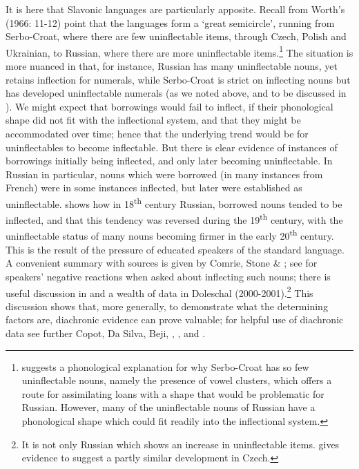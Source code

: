\documentclass[output=paper]{langscibook}
\begin{document}
It is here that Slavonic languages are particularly apposite. Recall from  Worth’s (1966: 11-12) point that the languages form a ‘great semicircle’, running from Serbo-Croat, where there are few uninflectable items, through Czech, Polish and Ukrainian, to Russian, where there are more uninflectable items.\footnote{\citet{Naylor1982} suggests a phonological explanation for why Serbo-Croat has so few uninflectable nouns, namely the presence of vowel clusters, which offers a route for assimilating loans with a shape that would be problematic for Russian. However, many of the uninflectable nouns of Russian have a phonological shape which could fit readily into the inflectional system.}  The situation is more nuanced in that, for instance, Russian has many uninflectable nouns, yet retains inflection for numerals, while Serbo-Croat is strict on inflecting nouns but has developed uninflectable numerals (as we noted above, and to be discussed in ). We might expect that borrowings would fail to inflect, if their phonological shape did not fit with the inflectional system, and that they might be accommodated over time; hence that the underlying trend would be for uninflectables to become inflectable. But there is clear evidence of instances of borrowings initially being inflected, and only later becoming uninflectable. In Russian in particular, nouns which were borrowed (in many instances from French) were in some instances inflected, but later were established as uninflectable. \citet[161-164]{Mučnik1964} shows how in 18\textsuperscript{th} century Russian, borrowed nouns tended to be inflected, and that this tendency was reversed during the 19\textsuperscript{th} century, with the uninflectable status of many nouns becoming firmer in the early 20\textsuperscript{th} century. This is the result of the pressure of educated speakers of the standard language. A convenient summary with sources is given by Comrie, Stone \& \citet[117-123]{Polinsky1996}; see \citet[45-55]{Panov1968} for speakers’ negative reactions when asked about inflecting such nouns; there is useful discussion in \citet{Dunn1988} and a wealth of data in Doleschal (2000-2001).\footnote{It is not only Russian which shows an increase in uninflectable items. \citet{Auty1968} gives evidence to suggest a partly similar development in Czech.} This discussion shows that, more generally, to demonstrate what the determining factors are, diachronic evidence can prove valuable; for helpful use of diachronic data see further Copot, Da Silva, Beji, \citet{WatiezBonami2025}, \citet{Friedewald2025}, \citet{RennerRenwick2025} and \citet{Souag2025}.
\end{document}
